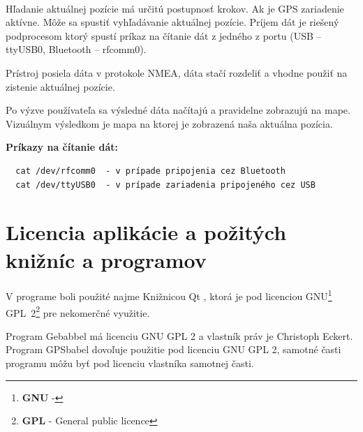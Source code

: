 \paragraph{}
Hľadanie aktuálnej pozície má určitú postupnosť krokov. Ak je GPS zariadenie aktívne. Môže sa spustiť vyhľadávanie aktuálnej pozície. Príjem dát je riešený podprocesom ktorý spustí príkaz na čítanie dát z jedného z portu (USB – ttyUSB0, Bluetooth – rfcomm0).

Prístroj posiela dáta v protokole NMEA, dáta stačí rozdeliť a vhodne použiť na zistenie aktuálnej pozície. 

Po výzve používateľa sa výsledné dáta načítajú a pravidelne zobrazujú na mape. Vizuálnym výsledkom je mapa na ktorej je zobrazená naša aktuálna pozícia.
\begin{flushleft}
\textbf{Príkazy na čítanie dát:}
\begin{verbatim}
  cat /dev/rfcomm0  - v prípade pripojenia cez Bluetooth
  cat /dev/ttyUSB0  - v prípade zariadenia pripojeného cez USB
\end{verbatim}
\end{flushleft}

\section{Licencia aplikácie a požitých knižníc a programov}
\paragraph{}
V programe boli použité najme Knižnicou Qt , ktorá je pod licenciou GNU\footnote{\textbf{GNU} - } GPL~2\footnote{\textbf{GPL} - General public licence} pre nekomerčné využitie. 

Program Gebabbel má licenciu GNU GPL 2 a vlastník práv je Christoph Eckert. 
Program GPSbabel dovoľuje použitie pod licenciu GNU GPL 2, samotné časti programu môžu byť pod licenciu vlastníka samotnej časti.
